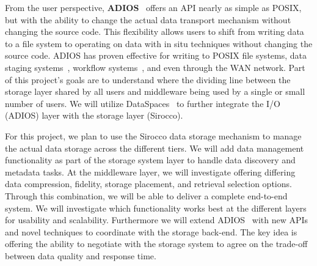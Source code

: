 From the user perspective,
{\bf ADIOS}~\cite{lofstead:2009:adaptible} offers an API nearly as simple as POSIX, but with the
ability to change the actual data transport mechanism without changing the
source code. This flexibility allows users to shift from writing data to a file system
to operating on data with in situ techniques without changing the source code.
ADIOS has proven effective for writing to POSIX file
systems, data staging systems~\cite{zheng:2010:predata,docan:2010:dataspaces,oldfield:2006:nessie}, workflow
systems~\cite{Dayal:2014:flexpath}, and even through the WAN network. 
Part of this project's goals are to understand where the dividing line
between the storage layer shared by all users and middleware being used by a
single or small number of users. We will utilize DataSpaces~\cite{docan:2010:dataspaces} to 
further integrate the I/O (ADIOS) layer with the storage layer (Sirocco).
%
% 

For this project, we plan to use the Sirocco data storage mechanism to manage
the actual data storage across the different tiers. We will add data management functionality as part of the storage
system layer to handle data discovery and metadata tasks. At the middleware
layer, we will investigate offering differing data compression, fidelity,
storage placement, and retrieval selection options.  Through this combination,
we will be able to deliver a complete end-to-end system. We will investigate
which functionality works best at the different layers for usability and
scalability. Furthermore we will  extend ADIOS~\cite{lofstead:2009:adaptible} with new APIs and novel
techniques to coordinate with the storage back-end. The key idea is offering
the ability to negotiate with the storage system to agree on the trade-off
between data quality and response time. 

